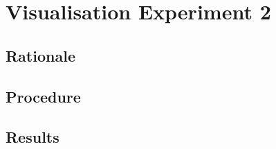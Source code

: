 
\chapter{Visualisation Experiment 2}
\label{cha:experimenttwo}

\section{Rationale}
\label{sec:experimenttworationale}

\section{Procedure}
\label{sec:experimenttwoprocedure}

\section{Results}
\label{sec:experimenttworesults}

